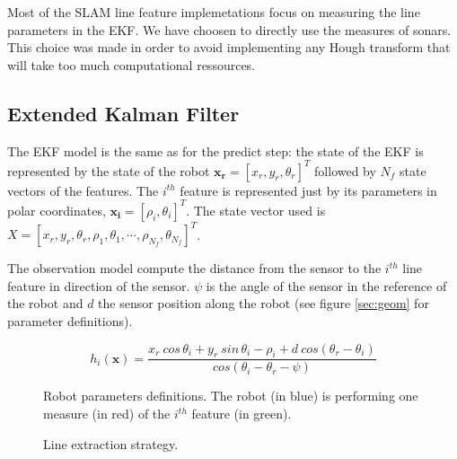 \documentclass[a4paper,12pt]{article}
\begin{document}
Most of the SLAM line feature implemetations focus on measuring the line parameters in the EKF. We have choosen to directly use the measures of sonars.
This choice was made in order to avoid implementing any Hough transform that will take too much computational ressources.


\subsection{Extended Kalman Filter}
\label{sec:EKF}

The EKF model is the same as \cite{zunino2001simultaneous} for the predict step: the state of the EKF is represented by the state of the robot $\mathbf{x_r} = [x_r,y_r,\theta_r ]^T$ followed by $N_f$ state vectors of the features.
The $i^{th}$ feature is represented just by its parameters in polar coordinates, $\mathbf{x_i} = [\rho_i, \theta_i]^T$.
The state vector used is $X = [x_r,y_r,\theta_r,\rho_1, \theta_1, \cdots, \rho_{N_f}, \theta_{N_f}]^T$.

The observation model compute the distance from the sensor to the $i^{th}$ line feature in direction of the sensor. $\psi$ is the angle of the sensor in the reference of the robot and $d$ the sensor position along the robot (see figure \ref{sec:geom} for parameter definitions).

\begin{equation}
h_i(\mathbf{x}) =\frac{ x_r \: cos \, \theta_i + y_r \: sin \, \theta_i - \rho_i + d\: cos(\theta_r-\theta_i)}{cos(\theta_i-\theta_r-\psi)} 
\end{equation}

\begin{figure}[ht]
\centering
\begin{minipage}[b]{0.45\linewidth}

\centering
	
  	\caption{Robot parameters definitions. The robot (in blue) is performing one measure (in red) of the $i^{th}$ feature (in green).}
  	\label{fig:geom}
\end{minipage}
\quad
\begin{minipage}[b]{0.45\linewidth}
\centering
	
  	\caption{Line extraction strategy.}
\label{fig:algo}
\end{minipage}
\end{figure}

\end{document}
